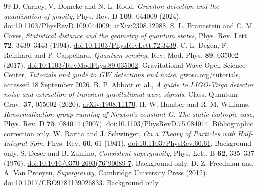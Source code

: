 \documentclass[a4paper,11pt]{article}
\begin{document}
\begin{thebibliography}{99}
 D. Carney, V. Domcke and N. L. Rodd, \emph{Graviton detection and the quantization of gravity}, Phys. Rev. D \textbf{109}, 044009 (2024). \href{https://doi.org/10.1103/PhysRevD.109.044009}{doi:10.1103/PhysRevD.109.044009}; \href{https://arxiv.org/abs/2308.12988}{arXiv:2308.12988}.
 S. L. Braunstein and C. M. Caves, \emph{Statistical distance and the geometry of quantum states}, Phys. Rev. Lett. \textbf{72}, 3439--3443 (1994). \href{https://doi.org/10.1103/PhysRevLett.72.3439}{doi:10.1103/PhysRevLett.72.3439}.
 C. L. Degen, F. Reinhard and P. Cappellaro, \emph{Quantum sensing}, Rev. Mod. Phys. \textbf{89}, 035002 (2017). \href{https://doi.org/10.1103/RevModPhys.89.035002}{doi:10.1103/RevModPhys.89.035002}.
 Gravitational Wave Open Science Center, \emph{Tutorials and guide to GW detections and noise}. \href{https://gwosc.org/tutorials/}{gwosc.org/tutorials}, accessed 18 September 2026.
 B. P. Abbott et al., \emph{A guide to LIGO-Virgo detector noise and extraction of transient gravitational-wave signals}, Class. Quantum Grav. \textbf{37}, 055002 (2020). \href{https://arxiv.org/abs/1908.11170}{arXiv:1908.11170}.
 H. W. Hamber and R. M. Williams, \emph{Renormalization group running of Newton's constant G: The static isotropic case}, Phys. Rev. D \textbf{75}, 084014 (2007). \href{https://doi.org/10.1103/PhysRevD.75.084014}{doi:10.1103/PhysRevD.75.084014}. Bibliographic correction only.
 W. Rarita and J. Schwinger, \emph{On a Theory of Particles with Half-Integral Spin}, Phys. Rev. \textbf{60}, 61 (1941). \href{https://doi.org/10.1103/PhysRev.60.61}{doi:10.1103/PhysRev.60.61}. Background only.
 S. Deser and B. Zumino, \emph{Consistent supergravity}, Phys. Lett. B \textbf{62}, 335--337 (1976). \href{https://doi.org/10.1016/0370-2693(76)90089-7}{doi:10.1016/0370-2693(76)90089-7}. Background only.
 D. Z. Freedman and A. Van Proeyen, \emph{Supergravity}, Cambridge University Press (2012). \href{https://doi.org/10.1017/CBO9781139026833}{doi:10.1017/CBO9781139026833}. Background only.
\end{thebibliography}
\end{document}
